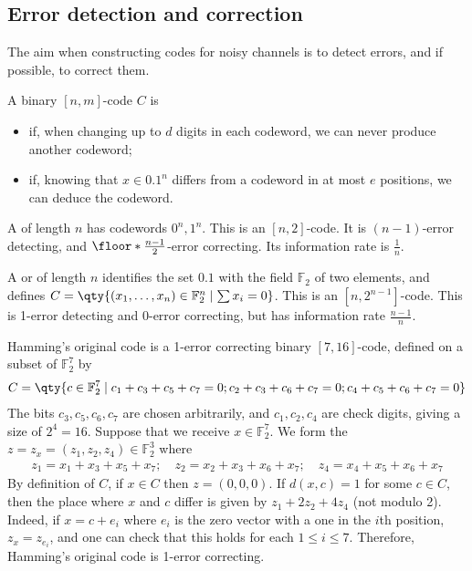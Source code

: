 \subsection{Error detection and correction}
The aim when constructing codes for noisy channels is to detect errors, and if possible, to correct them.
\begin{definition}
    A binary $[n,m]$-code $C$ is
    \begin{itemize}
        \item {} if, when changing up to $d$ digits in each codeword, we can never produce another codeword;
        \item {} if, knowing that $x \in \qty{0,1}^n$ differs from a codeword in at most $e$ positions, we can deduce the codeword.
    \end{itemize}
\end{definition}
\begin{example}
    A  of length $n$ has codewords $0^n, 1^n$.
    This is an $[n,2]$-code.
    It is $(n-1)$-error detecting, and $\floor*{\frac{n-1}{2}}$-error correcting.
    Its information rate is $\frac{1}{n}$.
\end{example}
\begin{example}
    A  or  of length $n$ identifies the set $\qty{0,1}$ with the field $\mathbb F_2$ of two elements, and defines $C = \qty{(x_1, \dots, x_n) \in \mathbb F_2^n \mid \sum x_i = 0}$.
    This is an $[n,2^{n-1}]$-code.
    This is 1-error detecting and 0-error correcting, but has information rate $\frac{n-1}{n}$.
\end{example}
\begin{example}
    Hamming's original code is a 1-error correcting binary $[7,16]$-code, defined on a subset of $\mathbb F_2^7$ by
    \begin{align*}
        C = \qty{c \in \mathbb F_2^7 \mid c_1 + c_3 + c_5 + c_7 = 0; c_2 + c_3 + c_6 + c_7 = 0; c_4 + c_5 + c_6 + c_7 = 0}
    \end{align*}
    The bits $c_3, c_5, c_6, c_7$ are chosen arbitrarily, and $c_1, c_2, c_4$ are check digits, giving a size of $2^4 = 16$.
    Suppose that we receive $x \in \mathbb F_2^7$.
    We form the  $z = z_x = (z_1, z_2, z_4) \in \mathbb F_2^3$ where
    \begin{align*}
        z_1 = x_1 + x_3 + x_5 + x_7;\quad z_2 = x_2 + x_3 + x_6 + x_7;\quad z_4 = x_4 + x_5 + x_6 + x_7
    \end{align*}
    By definition of $C$, if $x \in C$ then $z = (0, 0, 0)$.
    If $d(x,c) = 1$ for some $c \in C$, then the place where $x$ and $c$ differ is given by $z_1 + 2z_2 + 4z_4$ (not modulo 2).
    Indeed, if $x = c + e_i$ where $e_i$ is the zero vector with a one in the $i$th position, $z_x = z_{e_i}$, and one can check that this holds for each $1 \leq i \leq 7$.
    Therefore, Hamming's original code is 1-error correcting.
\end{example}
